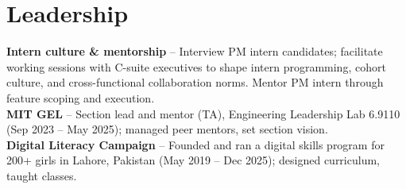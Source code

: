 \documentclass[11pt]{article}
\begin{document}
\section{Leadership}
\textbf{Intern culture \& mentorship} -- Interview PM intern candidates; facilitate working sessions with C-suite executives to shape intern programming, cohort culture, and cross-functional collaboration norms. Mentor PM intern through feature scoping and execution. \\
\textbf{MIT GEL} -- Section lead and mentor (TA), Engineering Leadership Lab 6.9110 (Sep 2023 -- May 2025); managed peer mentors, set section vision. \\
\textbf{Digital Literacy Campaign} -- Founded and ran a digital skills program for 200+ girls in Lahore, Pakistan (May 2019 -- Dec 2025); designed curriculum, taught classes.
\end{document}
